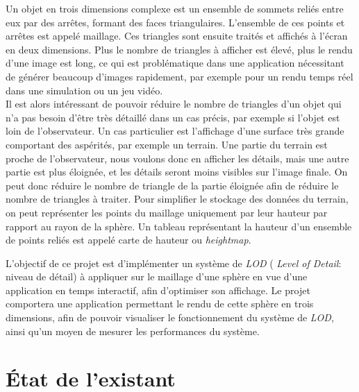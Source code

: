 \documentclass[12pt]{report}
\begin{document}
Un objet en trois dimensions complexe est un ensemble de sommets reliés
entre eux par des arrêtes, formant des faces triangulaires. L'ensemble
de ces points et arrêtes est appelé maillage. Ces triangles sont ensuite
traités et affichés à l'écran en deux dimensions. Plus le nombre de
triangles à afficher est élevé, plus le rendu d'une image est long, ce
qui est problématique dans une application nécessitant de générer
beaucoup d'images rapidement, par exemple pour un rendu temps réel dans
une simulation ou un jeu vidéo.\\
Il est alors intéressant de pouvoir réduire le nombre de triangles d'un
objet qui n'a pas besoin d'être très détaillé dans un cas précis, par
exemple si l'objet est loin de l'observateur. Un cas particulier est
l'affichage d'une surface très grande comportant des aspérités, par
exemple un terrain. Une partie du terrain est proche de l'observateur,
nous voulons donc en afficher les détails, mais une autre partie est
plus éloignée, et les détails seront moins visibles sur l'image finale.
On peut donc réduire le nombre de triangle de la partie éloignée afin de
réduire le nombre de triangles à traiter. Pour simplifier le stockage
des données du terrain, on peut représenter les points du maillage
uniquement par leur hauteur par rapport au rayon de la sphère. Un
tableau représentant la hauteur d'un ensemble de points reliés est
appelé carte de hauteur ou \emph{heightmap}.

L'objectif de ce projet est d'implémenter un système de \emph{LOD} (
\emph{Level of Detail}: niveau de détail) à appliquer sur le maillage
d'une sphère en vue d'une application en temps interactif, afin
d'optimiser son affichage. Le projet comportera une application
permettant le rendu de cette sphère en trois dimensions, afin de pouvoir
visualiser le fonctionnement du système de \emph{LOD}, ainsi qu'un moyen
de mesurer les performances du système.

\newpage

\chapter*{État de l'existant}
\setcounter{chapter}{2}

\end{document}
